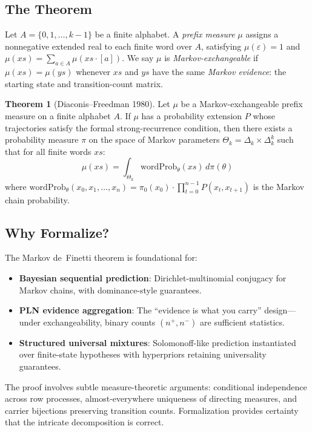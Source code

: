 \documentclass[11pt,a4paper]{article}
\theoremstyle{definition}
\newtheorem{theorem}{Theorem}[section]
\begin{document}
\subsection{The Theorem}

Let $A = \{0, 1, \ldots, k-1\}$ be a finite alphabet. A \emph{prefix measure}
$\mu$ assigns a nonnegative extended real to each finite word over $A$, satisfying
$\mu(\varepsilon) = 1$ and $\mu(xs) = \sum_{a \in A} \mu(xs \cdot [a])$. We say
$\mu$ is \emph{Markov-exchangeable} if $\mu(xs) = \mu(ys)$ whenever $xs$ and $ys$
have the same \emph{Markov evidence}: the starting state and transition-count matrix.

\begin{theorem}[Diaconis--Freedman 1980]\label{thm:df80}
Let $\mu$ be a Markov-exchangeable prefix measure on a finite alphabet $A$.
If $\mu$ has a probability extension $P$ whose trajectories satisfy the
formal strong-recurrence condition, then there exists a probability measure
$\pi$ on the space of Markov parameters
$\Theta_k = \Delta_k \times \Delta_k^k$ such that for all finite words $xs$:
\[
\mu(xs) = \int_{\Theta_k} \mathrm{wordProb}_\theta(xs) \, d\pi(\theta)
\]
where $\mathrm{wordProb}_\theta(x_0, x_1, \ldots, x_n) = \pi_0(x_0) \cdot \prod_{t=0}^{n-1} P(x_t, x_{t+1})$
is the Markov chain probability.
\end{theorem}

\subsection{Why Formalize?}

The Markov de~Finetti theorem is foundational for:
\begin{itemize}
\item \textbf{Bayesian sequential prediction}: Dirichlet-multinomial conjugacy
  for Markov chains, with dominance-style guarantees.
\item \textbf{PLN evidence aggregation}: The ``evidence is what you carry''
  design---under exchangeability, binary counts $(n^+, n^-)$ are sufficient
  statistics.
\item \textbf{Structured universal mixtures}: Solomonoff-like prediction
  instantiated over finite-state hypotheses with hyperpriors retaining
  universality guarantees.
\end{itemize}

The proof involves subtle measure-theoretic arguments: conditional independence
across row processes, almost-everywhere uniqueness of directing measures, and
carrier bijections preserving transition counts. Formalization provides
certainty that the intricate decomposition is correct.
\end{document}
